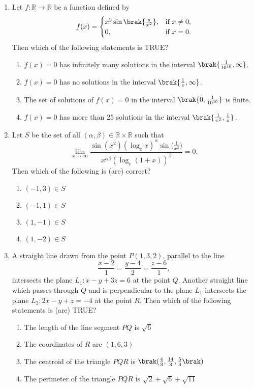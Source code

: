 \documentclass[12pt,a4paper]{article}
\begin{document}
\begin{enumerate}
    \item Let $ f : \mathbb{R} \to \mathbb{R} $ be a function defined by  
\[
    f(x) =
    \begin{cases} 
        x^2 \sin \brak{ \frac{\pi}{x^2} }, & \text{if } x \neq 0, \\
        0, & \text{if } x = 0.
    \end{cases}
\]
    Then which of the following statements is TRUE?  
    \begin{enumerate}[label=\Alph*.]
        \item $ f(x) = 0 $ has infinitely many solutions in the interval $ \brak{ \frac{1}{10^{10}}, \infty } $.
        \item $ f(x) = 0 $ has no solutions in the interval $ \brak{ \frac{1}{\pi}, \infty } $.
        \item The set of solutions of $ f(x) = 0 $ in the interval $ \brak{ 0, \frac{1}{10^{10}} } $ is finite.
        \item $ f(x) = 0 $ has more than 25 solutions in the interval $ \brak{ \frac{1}{\pi^2}, \frac{1}{\pi} } $.
    \end{enumerate}
\item Let $S$ be the set of all $(\alpha, \beta) \in \mathbb{R} \times \mathbb{R}$ such that
\[
\lim_{x \to \infty} \frac{\sin(x^2)(\log_e x)^{\alpha} \sin\bigg(\frac{1}{x^2}\bigg)}{x^{\alpha \beta} (\log_e(1+x))^{\beta}} = 0.
\]
Then which of the following is (are) correct?

\begin{enumerate}[label=\Alph*.]
    \item $(-1,3) \in S$
    \item $(-1,1) \in S$
    \item $(1,-1) \in S$
    \item $(1,-2) \in S$
\end{enumerate}

\item A straight line drawn from the point $P(1,3,2)$, parallel to the line
\[
\frac{x - 2}{1} = \frac{y - 4}{2} = \frac{z - 6}{1},
\]
intersects the plane $L_1: x - y + 3z = 6$ at the point $Q$. Another straight line which passes through $Q$ and is perpendicular to the plane $L_1$ intersects the plane $L_2: 2x - y + z = -4$ at the point $R$. Then which of the following statements is (are) TRUE?

\begin{enumerate}[label=\Alph*.]
    \item The length of the line segment $PQ$ is $\sqrt{6}$
    \item The coordinates of $R$ are $(1,6,3)$
    \item The centroid of the triangle $PQR$ is $\brak( \frac{4}{3}, \frac{14}{3}, \frac{5}{3} \brak)$
    \item The perimeter of the triangle $PQR$ is $\sqrt{2} + \sqrt{6} + \sqrt{11}$
\end{enumerate}


\end{enumerate}
\end{document}
